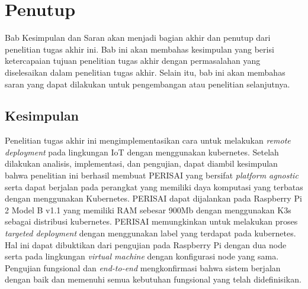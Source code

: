 \chapter{Penutup}

Bab Kesimpulan dan Saran akan menjadi bagian akhir dan penutup dari penelitian tugas akhir ini. Bab ini akan membahas kesimpulan yang berisi ketercapaian tujuan penelitian tugas akhir dengan permasalahan yang diselesaikan dalam penelitian tugas akhir. Selain itu, bab ini akan membahas saran yang dapat dilakukan untuk pengembangan atau penelitian selanjutnya.

\section{Kesimpulan}
Penelitian tugas akhir ini mengimplementasikan cara untuk melakukan \textit{remote deployment} pada lingkungan IoT dengan menggunakan kubernetes. Setelah dilakukan analisis, implementasi, dan pengujian, dapat diambil kesimpulan bahwa penelitian ini berhasil membuat PERISAI yang bersifat \textit{platform agnostic} serta dapat berjalan pada perangkat yang memiliki daya komputasi yang terbatas dengan menggunakan Kubernetes. PERISAI dapat dijalankan pada Raspberry Pi 2 Model B v1.1 yang memiliki RAM sebesar 900Mb dengan menggunakan K3s sebagai distribusi kubernetes. PERISAI memungkinkan untuk melakukan proses \textit{targeted deployment} dengan menggunakan label yang terdapat pada kubernetes. Hal ini dapat dibuktikan dari pengujian pada Raspberry Pi dengan dua node serta pada lingkungan \textit{virtual machine} dengan konfigurasi node yang sama. Pengujian fungsional dan \textit{end-to-end} mengkonfirmasi bahwa sistem berjalan dengan baik dan memenuhi semua kebutuhan fungsional yang telah didefinisikan.

